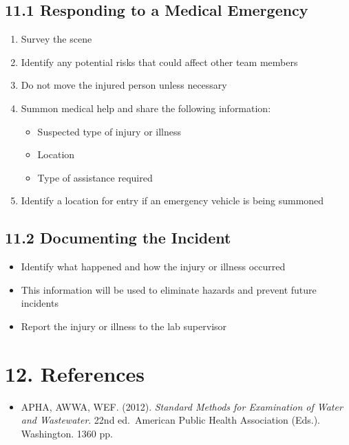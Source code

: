 \documentclass[
  11pt,
  letterpaper,
]{article}
\providecommand{\tightlist}{%
  \setlength{\itemsep}{0pt}\setlength{\parskip}{0pt}}
\begin{document}
\subsection{11.1 Responding to a Medical
Emergency}\label{responding-to-a-medical-emergency}

\begin{enumerate}
\def\labelenumi{\arabic{enumi}.}
\tightlist
\item
  Survey the scene
\item
  Identify any potential risks that could affect other team members
\item
  Do not move the injured person unless necessary
\item
  Summon medical help and share the following information:

  \begin{itemize}
  \tightlist
  \item
    Suspected type of injury or illness
  \item
    Location
  \item
    Type of assistance required
  \end{itemize}
\item
  Identify a location for entry if an emergency vehicle is being
  summoned
\end{enumerate}

\subsection{11.2 Documenting the
Incident}\label{documenting-the-incident}

\begin{itemize}
\tightlist
\item
  Identify what happened and how the injury or illness occurred
\item
  This information will be used to eliminate hazards and prevent future
  incidents
\item
  Report the injury or illness to the lab supervisor
\end{itemize}

\section{12. References}\label{references}

\begin{itemize}
\tightlist
\item
  APHA, AWWA, WEF. (2012). \emph{Standard Methods for Examination of
  Water and Wastewater}. 22nd ed.~American Public Health Association
  (Eds.). Washington. 1360 pp.
\end{itemize}
\end{document}
